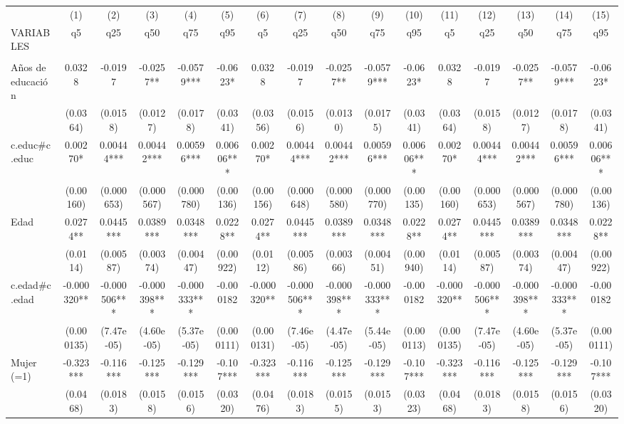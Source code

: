 \documentclass[]{article}
\begin{document}
\begin{tabular}{lccccccccccccccc} \hline
 & (1) & (2) & (3) & (4) & (5) & (6) & (7) & (8) & (9) & (10) & (11) & (12) & (13) & (14) & (15) \\
VARIABLES & q5 & q25 & q50 & q75 & q95 & q5 & q25 & q50 & q75 & q95 & q5 & q25 & q50 & q75 & q95 \\ \hline
 &  &  &  &  &  &  &  &  &  &  &  &  &  &  &  \\
Años de educación & 0.0328 & -0.0197 & -0.0257** & -0.0579*** & -0.0623* & 0.0328 & -0.0197 & -0.0257** & -0.0579*** & -0.0623* & 0.0328 & -0.0197 & -0.0257** & -0.0579*** & -0.0623* \\
 & (0.0364) & (0.0158) & (0.0127) & (0.0178) & (0.0341) & (0.0356) & (0.0156) & (0.0130) & (0.0175) & (0.0341) & (0.0364) & (0.0158) & (0.0127) & (0.0178) & (0.0341) \\
c.educ\#c.educ & 0.00270* & 0.00444*** & 0.00442*** & 0.00596*** & 0.00606*** & 0.00270* & 0.00444*** & 0.00442*** & 0.00596*** & 0.00606*** & 0.00270* & 0.00444*** & 0.00442*** & 0.00596*** & 0.00606*** \\
 & (0.00160) & (0.000653) & (0.000567) & (0.000780) & (0.00136) & (0.00156) & (0.000648) & (0.000580) & (0.000770) & (0.00135) & (0.00160) & (0.000653) & (0.000567) & (0.000780) & (0.00136) \\
Edad & 0.0274** & 0.0445*** & 0.0389*** & 0.0348*** & 0.0228** & 0.0274** & 0.0445*** & 0.0389*** & 0.0348*** & 0.0228** & 0.0274** & 0.0445*** & 0.0389*** & 0.0348*** & 0.0228** \\
 & (0.0114) & (0.00587) & (0.00374) & (0.00447) & (0.00922) & (0.0112) & (0.00586) & (0.00366) & (0.00451) & (0.00940) & (0.0114) & (0.00587) & (0.00374) & (0.00447) & (0.00922) \\
c.edad\#c.edad & -0.000320** & -0.000506*** & -0.000398*** & -0.000333*** & -0.000182 & -0.000320** & -0.000506*** & -0.000398*** & -0.000333*** & -0.000182 & -0.000320** & -0.000506*** & -0.000398*** & -0.000333*** & -0.000182 \\
 & (0.000135) & (7.47e-05) & (4.60e-05) & (5.37e-05) & (0.000111) & (0.000131) & (7.46e-05) & (4.47e-05) & (5.44e-05) & (0.000113) & (0.000135) & (7.47e-05) & (4.60e-05) & (5.37e-05) & (0.000111) \\
Mujer (=1) & -0.323*** & -0.116*** & -0.125*** & -0.129*** & -0.107*** & -0.323*** & -0.116*** & -0.125*** & -0.129*** & -0.107*** & -0.323*** & -0.116*** & -0.125*** & -0.129*** & -0.107*** \\
 & (0.0468) & (0.0183) & (0.0158) & (0.0156) & (0.0320) & (0.0476) & (0.0183) & (0.0155) & (0.0153) & (0.0323) & (0.0468) & (0.0183) & (0.0158) & (0.0156) & (0.0320) \\

\end{tabular}
\end{document}
